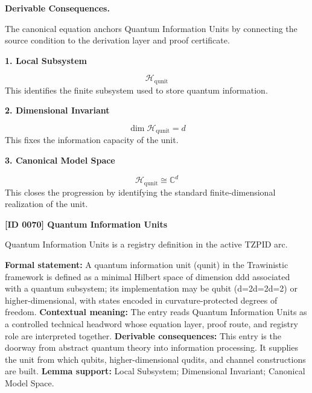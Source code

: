 \par\vspace{0.35em}
\noindent\textbf{Derivable Consequences.}\quad
\begingroup
\footnotesize
\raggedright
The canonical equation anchors Quantum Information Units by connecting the source condition to the derivation layer and proof certificate.
\par\endgroup

\noindent\textbf{1. Local Subsystem}\par
\[
\mathcal{H}_{\mathrm{qunit}}
\]
\noindent This identifies the finite subsystem used to store quantum information.\par
\noindent\textbf{2. Dimensional Invariant}\par
\[
\dim \mathcal{H}_{\mathrm{qunit}} = d
\]
\noindent This fixes the information capacity of the unit.\par
\noindent\textbf{3. Canonical Model Space}\par
\[
\mathcal{H}_{\mathrm{qunit}} \cong \mathbb{C}^{d}
\]
\noindent This closes the progression by identifying the standard finite-dimensional realization of the unit.\par

\clearpage
\noindent\textbf{[ID 0070] Quantum Information Units}\par
\vspace{0.35em}
\begingroup\small
{}
Quantum Information Units is a registry definition in the active TZPID arc.

\begingroup\footnotesize\setlength{\emergencystretch}{3em}\sloppy
\textbf{Formal statement:} A quantum information unit (qunit) in the Trawinistic framework is defined as a minimal Hilbert space of dimension ddd associated with a quantum subsystem; its implementation may be qubit (d=2d=2d=2) or higher-dimensional, with states encoded in curvature-protected degrees of freedom. \textbf{Contextual meaning:} The entry reads Quantum Information Units as a controlled technical headword whose equation layer, proof route, and registry role are interpreted together. \textbf{Derivable consequences:} This entry is the doorway from abstract quantum theory into information processing. It supplies the unit from which qubits, higher-dimensional qudits, and channel constructions are built. \textbf{Lemma support:} Local Subsystem; Dimensional Invariant; Canonical Model Space.\par
\endgroup

